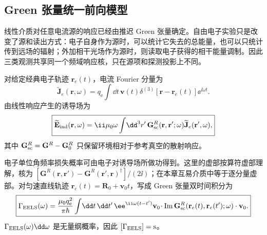 
\subsection{Green 张量统一前向模型}\label{subsec:green-forward-closure-dp47}

线性介质对任意电流源的响应已经由推迟 Green 张量确定。自由电子实验只是改变了源和读出方式：电子自身作为源时，可以统计它失去的总能量，也可以只统计传到远场的辐射；外加相干光场作为源时，则读取电子获得的相干能量调制。因此三类观测共享同一个频域响应核，只在源项和探测投影上不同。

\begin{definition}[电子源与散射响应]
对给定经典电子轨迹 $\mathbf r_e(t)$，电流 Fourier 分量为
\begin{equation}
 \widetilde{\mathbf J}_e(\mathbf r,\omega)
 =q_{\mathrm e}\int\!\dd t\,
 \mathbf v(t)\delta^{(3)}[\mathbf r-\mathbf r_e(t)]\ee^{\ii\omega t}.
\label{eq:electron_current_fourier_dp47}
\end{equation}
由线性响应产生的诱导场为
\begin{equation}
\boxed{
 \widetilde{\mathbf E}_{\rm ind}(\mathbf r,\omega)
 =\ii\mu_0\omega
 \int\!\dd^3 r'\,
 \mathbf G_{\rm sc}^R(\mathbf r,\mathbf r';\omega)
 \widetilde{\mathbf J}_e(\mathbf r',\omega),}
\label{eq:induced_field_green_dp47}
\end{equation}
其中 $\mathbf G_{\rm sc}^R=\mathbf G^R-\mathbf G_0^R$ 只保留环境相对于参考真空的散射响应。

\end{definition}

\begin{proposition}[轨迹上的损失泛函]
电子单位角频率损失概率可由电子对诱导场所做功得到。这里的虚部按算符虚部理解，核为 $[\mathbf G^R(\mathbf r,\mathbf r')-\mathbf G^R(\mathbf r',\mathbf r)^\dagger]/(2\ii)$；在本章互易介质中等于逐分量虚部。对匀速直线轨迹 $\mathbf r_e(t)=\mathbf R_0+\mathbf v_0t$，写成 Green 张量双时间积分为
\begin{equation}
\boxed{
 \Gamma_{\rm EELS}(\omega)
 =\frac{\mu_0q_{\mathrm e}^2}{\pi\hbar}
 \int\!\dd t\,\dd t'\,
 \ee^{\ii\omega(t-t')}
 \mathbf v_0\!\cdot
 \operatorname{Im}\mathbf G_{\rm sc}^R
 (\mathbf r_e(t),\mathbf r_e(t');\omega)
 \cdot\mathbf v_0 .}
\label{eq:eels_green_master_dp47}
\end{equation}
$\Gamma_{\rm EELS}(\omega)\dd\omega$ 是无量纲概率，因此 $[\Gamma_{\rm EELS}]={\rm s}$。

\end{proposition}

